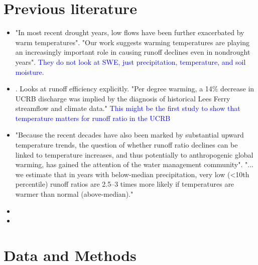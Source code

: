 \documentclass[draft]{agujournal2019}
\begin{document}
\section{Previous literature}

\begin{itemize}
\item {} "In most recent drought years, low flows have been further exacerbated by warm temperatures". "Our work suggests warming temperatures are playing an increasingly important role in causing runoff declines even in nondrought years". \textcolor{blue}{They do not look at SWE, just precipitation, temperature, and soil moisture}.

\item {}. Looks at runoff efficiency explicitly. "Per degree warming, a 14\% decrease in UCRB discharge was implied by the diagnosis of historical Lees Ferry streamflow and climate data." \textcolor{blue}{This might be the first study to show that temperature matters for runoff ratio in the UCRB}

\item {} "Because the recent decades have also been marked by substantial upward temperature trends, the question of whether runoff ratio declines can be linked to temperature increases, and thus potentially to anthropogenic global warming, has gained the attention of the water management community". 
"... we estimate that in years with below-median precipitation, very low (<10th percentile) runoff ratios are 2.5–3 times more likely if temperatures are warmer than normal (above-median)."

\item {} 

\item {} 


\end{itemize}

\section{Data and Methods}
\end{document}
